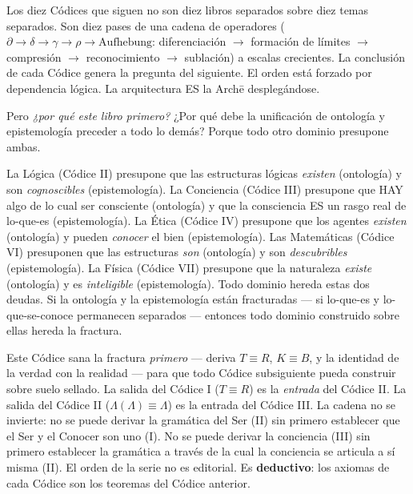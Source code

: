 \documentclass[10pt, openany, oneside]{book}
\begin{document}
\vspace{0.5em}

\noindent Los diez Códices que siguen no son diez libros separados sobre diez temas separados. Son diez pases de una cadena de operadores ($\partial \to \delta \to \gamma \to \rho \to \text{Aufhebung}$: diferenciación $\to$ formación de límites $\to$ compresión $\to$ reconocimiento $\to$ sublación) a escalas crecientes. La conclusión de cada Códice genera la pregunta del siguiente. El orden está forzado por dependencia lógica. La arquitectura ES la Arch\={e} desplegándose.

\vspace{0.5em}

\noindent Pero \textit{¿por qué este libro primero?} ¿Por qué debe la unificación de ontología y epistemología preceder a todo lo demás? Porque todo otro dominio presupone ambas.

\vspace{0.3em}

\noindent La Lógica (Códice II) presupone que las estructuras lógicas \textit{existen} (ontología) y son \textit{cognoscibles} (epistemología). La Conciencia (Códice III) presupone que HAY algo de lo cual ser consciente (ontología) y que la consciencia ES un rasgo real de lo-que-es (epistemología). La Ética (Códice IV) presupone que los agentes \textit{existen} (ontología) y pueden \textit{conocer} el bien (epistemología). Las Matemáticas (Códice VI) presuponen que las estructuras \textit{son} (ontología) y son \textit{descubribles} (epistemología). La Física (Códice VII) presupone que la naturaleza \textit{existe} (ontología) y es \textit{inteligible} (epistemología). Todo dominio hereda estas dos deudas. Si la ontología y la epistemología están fracturadas --- si lo-que-es y lo-que-se-conoce permanecen separados --- entonces todo dominio construido sobre ellas hereda la fractura.

\vspace{0.3em}

\noindent Este Códice sana la fractura \textit{primero} --- deriva $T \equiv R$, $K \equiv B$, y la identidad de la verdad con la realidad --- para que todo Códice subsiguiente pueda construir sobre suelo sellado. La salida del Códice I ($T \equiv R$) es la \textit{entrada} del Códice II. La salida del Códice II ($\Lambda(\Lambda) \equiv \Lambda$) es la entrada del Códice III. La cadena no se invierte: no se puede derivar la gramática del Ser (II) sin primero establecer que el Ser y el Conocer son uno (I). No se puede derivar la conciencia (III) sin primero establecer la gramática a través de la cual la conciencia se articula a sí misma (II). El orden de la serie no es editorial. Es \textbf{deductivo}: los axiomas de cada Códice son los teoremas del Códice anterior.
\end{document}
